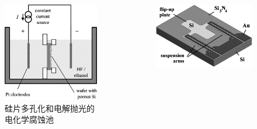 \begin{frame}[c]
    \begin{columns}
        \begin{column}{.3\textwidth}
            \begin{figure}[!htb] %
                \centering %
                \includegraphics[width=1.\textwidth]{figures/Microspectrometer based on a tunable optical filter of porous silicon_5.png} %
                \caption{硅片多孔化和电解抛光的电化学腐蚀池} %
            \end{figure}
        \end{column}
        \begin{column}{.4\textwidth}
            \begin{figure}[!htb] %
                \centering %
                \includegraphics[width=1.\textwidth]{figures/Microspectrometer based on a tunable optical filter of porous silicon_6.png} %

\end{figure}
\end{column}
\end{columns}
\end{frame}
